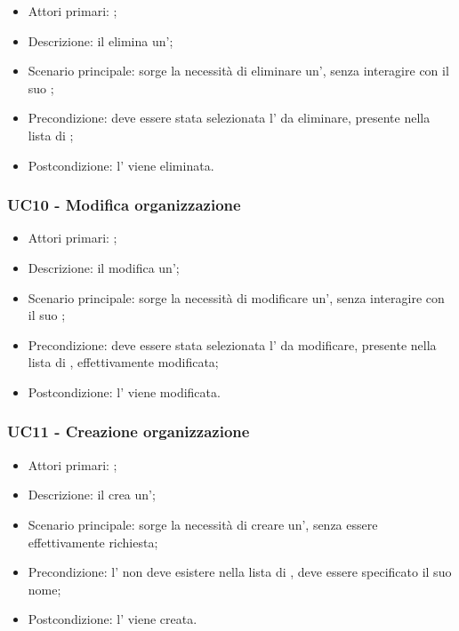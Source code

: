 \documentclass[../analisi-dei-requisiti]{subfiles}
\begin{document}
\begin{itemize}
\item Attori primari: ;
\item Descrizione: il  elimina un';
\item Scenario principale: sorge la necessità di eliminare un', senza interagire con il suo ; 
\item Precondizione: deve essere stata selezionata l' da eliminare, presente nella lista di ;
\item Postcondizione: l' viene eliminata.

\end{itemize}


\subsubsection{UC10 - Modifica organizzazione}
\label{subsub:UC10}

\begin{itemize}
\item Attori primari: ;
\item Descrizione: il  modifica un';
\item Scenario principale: sorge la necessità di modificare un', senza interagire con il suo ; 
\item Precondizione: deve essere stata selezionata l' da modificare, presente nella lista di , effettivamente modificata;
\item Postcondizione: l' viene modificata.

\end{itemize}


\subsubsection{UC11 - Creazione organizzazione}
\label{subsub:UC11}

\begin{itemize}
\item Attori primari: ;
\item Descrizione: il  crea un';
\item Scenario principale: sorge la necessità di creare un', senza essere effettivamente richiesta; 
\item Precondizione: l' non deve esistere nella lista di , deve essere specificato il suo nome;
\item Postcondizione: l' viene creata.

\end{itemize}
\end{document}
